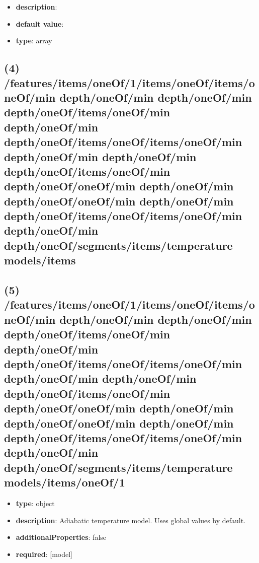 \begin{itemize}[leftmargin=3em]\item {\bf description}: 
\item {\bf default value}: 
\item {\bf type}: array
\end{itemize}\subsection{(4) /features/items/oneOf/1/items/oneOf/items/oneOf/min depth/oneOf/min depth/oneOf/min depth/oneOf/items/oneOf/min depth/oneOf/min depth/oneOf/items/oneOf/items/oneOf/min depth/oneOf/min depth/oneOf/min depth/oneOf/items/oneOf/min depth/oneOf/oneOf/min depth/oneOf/min depth/oneOf/oneOf/min depth/oneOf/min depth/oneOf/items/oneOf/items/oneOf/min depth/oneOf/min depth/oneOf/segments/items/temperature models/items}

\subsection{(5) /features/items/oneOf/1/items/oneOf/items/oneOf/min depth/oneOf/min depth/oneOf/min depth/oneOf/items/oneOf/min depth/oneOf/min depth/oneOf/items/oneOf/items/oneOf/min depth/oneOf/min depth/oneOf/min depth/oneOf/items/oneOf/min depth/oneOf/oneOf/min depth/oneOf/min depth/oneOf/oneOf/min depth/oneOf/min depth/oneOf/items/oneOf/items/oneOf/min depth/oneOf/min depth/oneOf/segments/items/temperature models/items/oneOf/1}
\begin{itemize}[leftmargin=5em]\item {\bf type}: object
\item {\bf description}: Adiabatic temperature model. Uses global values by default.
\item {\bf additionalProperties}: false
\item {\bf required}: [model]\end{itemize}
